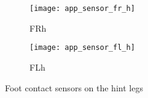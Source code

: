 \begin{figure}[H]
\centering
\begin{subfigure}{0.48\textwidth}
  \centering
  \texttt{[image: app\_sensor\_fr\_h]}
  \caption{FRh}
  \label{fig:app_fr_h}
\end{subfigure}
\begin{subfigure}{0.48\textwidth}
  \centering
  \texttt{[image: app\_sensor\_fl\_h]}
  \caption{FLh}
  \label{fig:app_fl_h}
\end{subfigure}
\caption{Foot contact sensors on the hint legs}
\label{fig:app_f_h}
\end{figure}